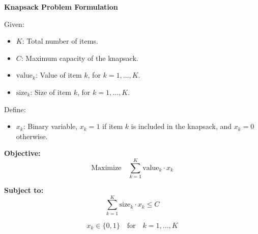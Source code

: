 \documentclass{article}
\begin{document}
\textbf{Knapsack Problem Formulation}

Given:
\begin{itemize}
    \item $K$: Total number of items.
    \item $C$: Maximum capacity of the knapsack.
    \item $\text{value}_k$: Value of item $k$, for $k = 1, \ldots, K$.
    \item $\text{size}_k$: Size of item $k$, for $k = 1, \ldots, K$.
\end{itemize}

Define:
\begin{itemize}
    \item $x_k$: Binary variable, $x_k = 1$ if item $k$ is included in the knapsack, and $x_k = 0$ otherwise.
\end{itemize}

\textbf{Objective:}
\[
\text{Maximize} \quad \sum_{k=1}^{K} \text{value}_k \cdot x_k
\]

\textbf{Subject to:}
\[
\sum_{k=1}^{K} \text{size}_k \cdot x_k \leq C
\]

\[
x_k \in \{0, 1\} \quad \text{for} \quad k = 1, \ldots, K
\]
\end{document}
